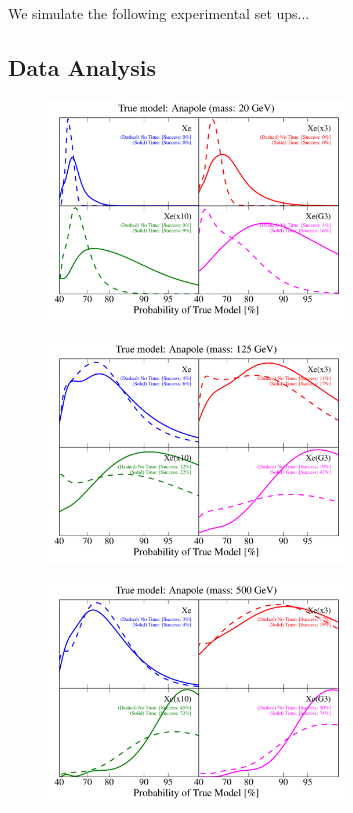 \documentclass[11pt]{article}
\begin{document}
We simulate the following experimental set ups...

\subsection{Data Analysis}

\begin{figure}
\centering
\includegraphics[width=0.7\textwidth]{plots/PDF_20GeV_Anapole_50sims_Xe_Xe3x_Xe10x_XeG3_GF_TNT.pdf}
\caption{\label{fig:500gev_anapole_XeFull_TNT_GF}}
\end{figure}

\begin{figure}
\centering
\includegraphics[width=0.7\textwidth]{plots/PDF_125GeV_Anapole_50sims_Xe_Xe3x_Xe10x_XeG3_GF_TNT.pdf}
\caption{\label{fig:500gev_anapole_XeFull_TNT_GF}}
\end{figure}

\begin{figure}
\centering
\includegraphics[width=0.7\textwidth]{plots/PDF_500GeV_Anapole_50sims_Xe_Xe3x_Xe10x_XeG3_GF_TNT.pdf}
\caption{\label{fig:500gev_anapole_XeFull_TNT_GF}}
\end{figure}
\end{document}
